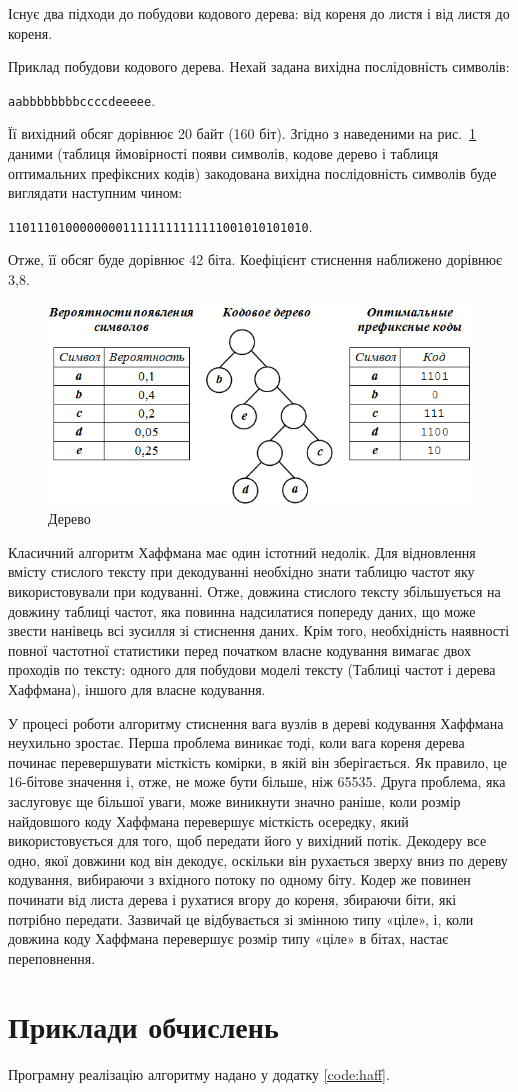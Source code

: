 Існує два підходи до побудови кодового дерева: від кореня до листя і від листя до кореня.

Приклад побудови кодового дерева. Нехай задана вихідна послідовність символів:

\verb'aabbbbbbbbccсcdeeeee'.

Її вихідний обсяг дорівнює 20 байт (160 біт). Згідно з наведеними на рис.~\ref{f:tree3} даними (таблиця ймовірності появи символів, кодове дерево і таблиця оптимальних префіксних кодів) закодована вихідна послідовність символів буде виглядати наступним чином:

\verb'110111010000000011111111111111001010101010'.

Отже, її обсяг буде дорівнює 42 біта. Коефіцієнт стиснення наближено дорівнює 3,8.
\begin{figure}
\caption{Дерево}\label{f:tree3}
\includegraphics[width=13cm]{pic/41_01.png}

\end{figure}

Класичний алгоритм Хаффмана має один істотний недолік. Для відновлення вмісту стислого тексту при декодуванні необхідно знати таблицю частот яку використовували при кодуванні. Отже, довжина стислого тексту збільшується на довжину таблиці частот, яка повинна надсилатися попереду даних, що може звести нанівець всі зусилля зі стиснення даних. Крім того, необхідність наявності повної частотної статистики перед початком власне кодування вимагає двох проходів по тексту: одного для побудови моделі тексту (Таблиці частот і дерева Хаффмана), іншого для власне кодування.


У процесі роботи алгоритму стиснення вага вузлів в дереві кодування Хаффмана неухильно зростає. Перша проблема виникає тоді, коли вага кореня дерева починає перевершувати місткість комірки, в якій він зберігається. Як правило, це 16-бітове значення і, отже, не може бути більше, ніж 65535. Друга проблема, яка заслуговує ще більшої уваги, може виникнути значно раніше, коли розмір найдовшого коду Хаффмана перевершує місткість осередку, який використовується для того, щоб передати його у вихідний потік. Декодеру все одно, якої довжини код він декодує, оскільки він рухається зверху вниз по дереву кодування, вибираючи з вхідного потоку по одному біту. Кодер же повинен починати від листа дерева і рухатися вгору до кореня, збираючи біти, які потрібно передати. Зазвичай це відбувається зі змінною типу «ціле», і, коли довжина коду Хаффмана перевершує розмір типу «ціле» в бітах, настає переповнення.

\section{Приклади обчислень}
\nopagebreak[4]

Програмну реалізацію алгоритму надано у додатку \ref{code:haff}.





